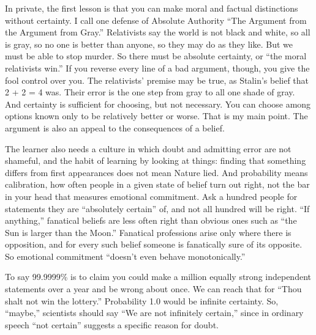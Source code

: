 In private, the first lesson is that you can make moral and factual distinctions without certainty. I call one defense of Absolute Authority ``The Argument from the Argument from Gray.'' Relativists say the world is not black and white, so all is gray, so no one is better than anyone, so they may do as they like. But we must be able to stop murder. So there must be absolute certainty, or ``the moral relativists win.'' If you reverse every line of a bad argument, though, you give the fool control over you. The relativists' premise may be true, as Stalin's belief that 2 + 2 = 4 was. Their error is the one step from gray to all one shade of gray. And certainty is sufficient for choosing, but not necessary. You can choose among options known only to be relatively better or worse. That is my main point. The argument is also an appeal to the consequences of a belief.

The learner also needs a culture in which doubt and admitting error are not shameful, and the habit of learning by looking at things: finding that something differs from first appearances does not mean Nature lied. And probability means calibration, how often people in a given state of belief turn out right, not the bar in your head that measures emotional commitment. Ask a hundred people for statements they are ``absolutely certain'' of, and not all hundred will be right.  ``If anything,'' fanatical beliefs are less often right than obvious ones such as ``the Sun is larger than the Moon.'' Fanatical professions arise only where there is opposition, and for every such belief someone is fanatically sure of its opposite. So emotional commitment ``doesn't even behave monotonically.'' 

To say 99.9999\% is to claim you could make a million equally strong independent statements over a year and be wrong about once. We can reach that for ``Thou shalt not win the lottery.'' Probability 1.0 would be infinite certainty. So, ``maybe,'' scientists should say ``We are not infinitely certain,'' since in ordinary speech ``not certain'' suggests a specific reason for doubt.
